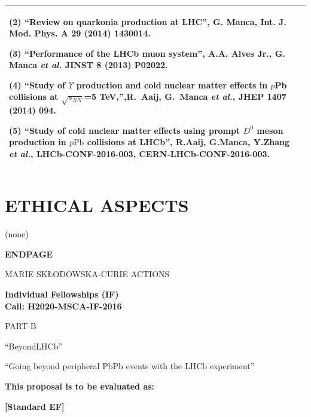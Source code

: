 \documentclass[a4paper,11pt]{article}
\newcommand{\acronym}{{\sc BeyondLHCb}\xspace} %
\newcommand{\fulltitle}{Going beyond peripheral PbPb events with the LHCb experiment\xspace}
\begin{document}
{\begin{tabular}{>{\raggedright}p{}p{}}
(2) “Review on quarkonia production at LHC”, G. Manca, Int. J. Mod. Phys. A {\bf 29} (2014) 1430014.

(3) “Performance of the LHCb muon system”, A.A. Alves Jr., G. Manca {\it et al.} JINST {\bf 8} (2013) P02022.

(4) ``Study of $\Upsilon$ production and cold nuclear matter effects in $p$Pb collisions at $\sqrt{s_{NN}}$=5 TeV,'',R.~Aaij, G.~Manca {\it et al.}, JHEP {\bf 1407} (2014) 094.

(5) ``Study of cold nuclear matter effects using prompt $D^0$ meson production in $p\mathrm{Pb}$ collisions at LHCb'', R.Aaij, G.Manca, Y.Zhang {\it et al.},  LHCb-CONF-2016-003, CERN-LHCb-CONF-2016-003.
\\\bottomrule
\end{tabular}
}
\vspace{\baselineskip}


\section{ETHICAL ASPECTS}

(none)


\newpage
\vspace{15mm}
\begin{center}


        \Large{
      
     
        \textbf{ENDPAGE}
  
          \vspace{15mm}
          MARIE SKŁODOWSKA-CURIE ACTIONS\\
          \vspace{1cm}
          
          \textbf{Individual Fellowships (IF)}\\
          \textbf{Call: H2020-MSCA-IF-2016}
          \vspace{2cm}                   

          PART B
          \vspace{2.5cm}

          ``\acronym''
          \vspace{1cm}
          
          ``\fulltitle''
          \vspace{2cm}

          \textbf{This proposal is to be evaluated as:}
          \vspace{.5cm}

          \textbf{[Standard EF]}
        }

  \end{center}
\vspace{1cm}
\end{document}
